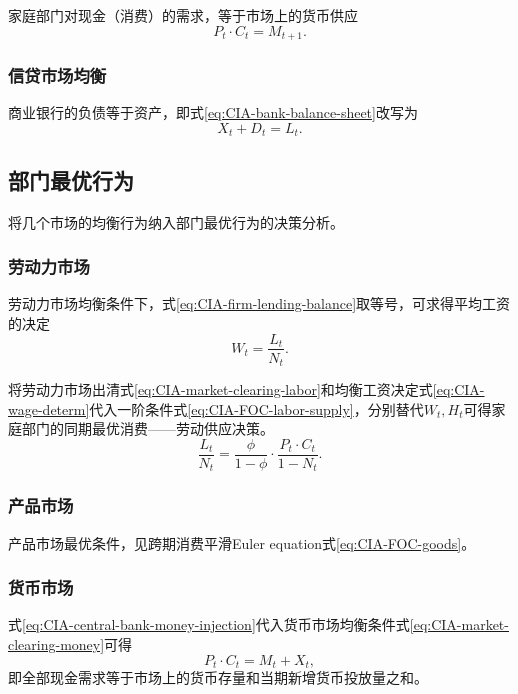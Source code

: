 家庭部门对现金（消费）的需求，等于市场上的货币供应
\begin{equation}
  \label{eq:CIA-market-clearing-money}
  P_t \cdot C_t = M_{t+1}.
\end{equation}

\subsubsection{信贷市场均衡}

商业银行的负债等于资产，即式\eqref{eq:CIA-bank-balance-sheet}改写为
\begin{equation}
  \label{eq:CIA-market-clearning-credit}
  X_t + D_t = L_t.
\end{equation}



\subsection{部门最优行为}
将几个市场的均衡行为纳入部门最优行为的决策分析。

\subsubsection{劳动力市场}
劳动力市场均衡条件下，式\eqref{eq:CIA-firm-lending-balance}取等号，可求得平均工资的决定
\begin{equation}
  \label{eq:CIA-wage-determ}
  W_t = \frac{L_t}{N_t}.
\end{equation}

将劳动力市场出清式\eqref{eq:CIA-market-clearing-labor}和均衡工资决定式\eqref{eq:CIA-wage-determ}代入一阶条件式\eqref{eq:CIA-FOC-labor-supply}，分别替代$W_t, H_t$可得家庭部门的同期最优消费——劳动供应决策。
\begin{equation}
  \label{CIA-optimal-labor-mkt-intratemp}
  \frac{L_t}{N_t}=\frac{\phi}{1-\phi} \cdot \frac{P_t \cdot C_t}{1-N_t}.
\end{equation}

\subsubsection{产品市场}
产品市场最优条件，见跨期消费平滑Euler equation式\eqref{eq:CIA-FOC-goods}。

\subsubsection{货币市场}
式\eqref{eq:CIA-central-bank-money-injection}代入货币市场均衡条件式\eqref{eq:CIA-market-clearing-money}可得
\begin{equation}
  \label{eq:CIA-market-clearing-money-flow}
  P_t \cdot C_t = M_t + X_t,
\end{equation}
即全部现金需求等于市场上的货币存量和当期新增货币投放量之和。

